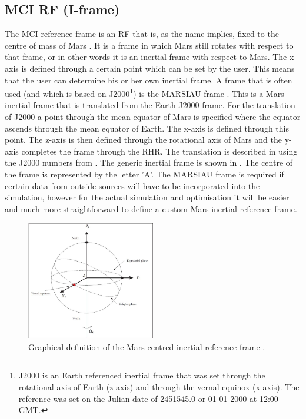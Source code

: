 \subsection{\acl{MCI} \ac{RF} (I-frame)}
\label{subsec:ECI}
The \acf{MCI} reference frame is an \ac{RF} that is, as the name implies, fixed to the centre of mass of Mars \citep{mooij2013fd}. It is a frame in which Mars still rotates with respect to that frame, or in other words it is an inertial frame with respect to Mars. The x-axis is defined through a certain point which can be set by the user. This means that the user can determine his or her own inertial frame. A frame that is often used (and which is based on J2000\footnote{J2000 is an Earth referenced inertial frame that was set through the rotational axis of Earth (z-axis) and through the vernal equinox (x-axis). The reference was set on the Julian date of 2451545.0 or 01-01-2000 at 12:00 \ac{GMT}.}) is the MARSIAU frame \cite{bachman2014naif,diaz2008generic}. This is a Mars inertial frame that is translated from the Earth J2000 frame. For the translation of J2000 a point through the mean equator of Mars is specified where the equator ascends through the mean equator of Earth. The x-axis is defined through this point. The z-axis is then defined through the rotational axis of Mars and the y-axis completes the frame through the \ac{RHR}. The translation is described in \cite{bachman2014naif,diaz2008generic} using the J2000 numbers from \cite{archinal2011report}. The generic inertial frame is shown in . The centre of the frame is represented by the letter 'A'. The MARSIAU frame is required if certain data from outside sources will have to be incorporated into the simulation, however for the actual simulation and optimisation it will be easier and much more straightforward to define a custom Mars inertial reference frame. 



\begin{figure}[!ht]
\centering
\includegraphics[width=0.5\textwidth]{figures/reference_frames/eci_mooij2013fd.jpg}
\caption{Graphical definition of the Mars-centred inertial reference frame \cite{mooij2013fd}.}
\label{fig:eci_mooij2013fd}
\end{figure}

